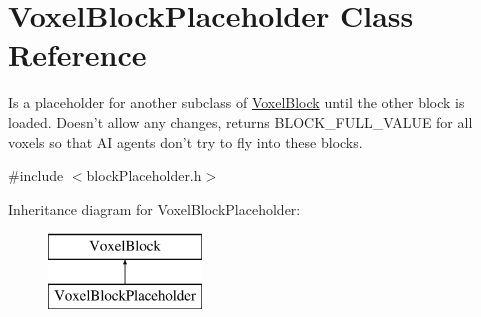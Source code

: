 \hypertarget{classVoxelBlockPlaceholder}{
\section{\-Voxel\-Block\-Placeholder \-Class \-Reference}
\label{d0/def/classVoxelBlockPlaceholder}
}


\-Is a placeholder for another subclass of \hyperlink{classVoxelBlock}{\-Voxel\-Block} until the other block is loaded. \-Doesn't allow any changes, returns \-B\-L\-O\-C\-K\-\_\-\-F\-U\-L\-L\-\_\-\-V\-A\-L\-U\-E for all voxels so that \-A\-I agents don't try to fly into these blocks.  




{\ttfamily \#include $<$block\-Placeholder.\-h$>$}

\-Inheritance diagram for \-Voxel\-Block\-Placeholder\-:\begin{figure}[H]
\begin{center}
\leavevmode
\includegraphics[height=2.000000cm]{d0/def/classVoxelBlockPlaceholder}
\end{center}
\end{figure}
